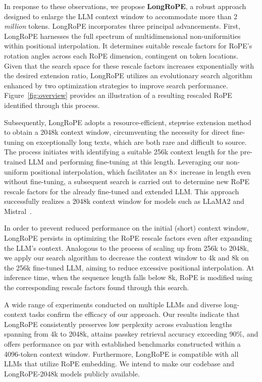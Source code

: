 In response to these observations, we propose \textbf{LongRoPE}, a robust approach designed to enlarge the LLM context window to accommodate more than 2 \emph{million} tokens. LongRoPE incorporates three principal advancements. First, {LongRoPE} harnesses the full spectrum of multidimensional non-uniformities within positional interpolation. It determines suitable rescale factors for RoPE's rotation angles across each RoPE dimension, contingent on token locations. Given that the search space for these rescale factors increases exponentially with the desired extension ratio, {LongRoPE} utilizes an evolutionary search algorithm enhanced by two optimization strategies to improve search performance. Figure~\ref{fig:overview} provides an illustration of a resulting rescaled RoPE identified through this process.

Subsequently, {LongRoPE} adopts a resource-efficient, stepwise extension method to obtain a 2048k context window, circumventing the necessity for direct fine-tuning on exceptionally long texts, which are both rare and difficult to source. The process initiates with identifying a suitable 256k context length for the pre-trained LLM and performing fine-tuning at this length. Leveraging our non-uniform positional interpolation, which facilitates an 8$\times$ increase in length even without fine-tuning, a subsequent search is carried out to determine new RoPE rescale factors for the already fine-tuned and extended LLM. This approach successfully realizes a 2048k context window for models such as LLaMA2 and Mistral~\cite{mistral}.

In order to prevent reduced performance on the initial (short) context window, {LongRoPE} persists in optimizing the RoPE rescale factors even after expanding the LLM's context. Analogous to the process of scaling up from 256k to 2048k, we apply our search algorithm to decrease the context window to 4k and 8k on the 256k fine-tuned LLM, aiming to reduce excessive positional interpolation. At inference time, when the sequence length falls below 8k, RoPE is modified using the corresponding rescale factors found through this search.

A wide range of experiments conducted on multiple LLMs and diverse long-context tasks confirm the efficacy of our approach. Our results indicate that LongRoPE consistently preserves low perplexity across evaluation lengths spanning from 4k to 2048k, attains passkey retrieval accuracy exceeding 90\%, and offers performance on par with established benchmarks constructed within a 4096-token context window. Furthermore, LongRoPE is compatible with all LLMs that utilize RoPE embedding. We intend to make our codebase and LongRoPE-2048k models publicly available.

